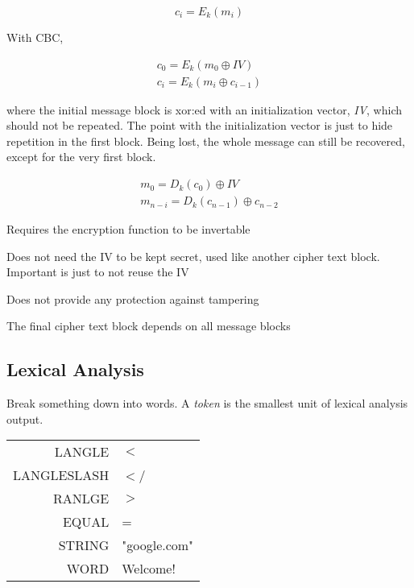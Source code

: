 \documentclass[12pt]{article}
\begin{document}
\begin{equation}
c_i = E_k(m_i)
\end{equation}

With CBC, 

\begin{equation}
\begin{split}
c_0 = E_k(m_0 \oplus IV) \\
c_i = E_k(m_i \oplus c_{i-1})
\end{split}
\end{equation}

where the initial message block is xor:ed with an initialization vector, \emph{IV}, which should not be repeated. The point with the initialization vector is just to hide repetition in the first block. Being lost, the whole message can still be recovered, except for the very first block.

\begin{equation}
\begin{split}
m_0 = D_k(c_0) \oplus IV \\
m_{n-i} = D_k(c_{n-1}) \oplus c_{n-2}
\end{split}
\end{equation}

\begin{list}{*}{
\setlength{\itemsep}{0pt}
\setlength{\parsep}{0pt}
\setlength{\topsep}{0pt}
\setlength{\partopsep}{0pt}
\setlength{\leftmargin}{2em}
\setlength{\labelwidth}{1.5em}
\setlength{\labelsep}{0.5em}
}
\item Requires the encryption function to be invertable
\item Does not need the IV to be kept secret, used like another cipher text block. Important is just to not reuse the IV
\item Does not provide any protection against tampering
\item The final cipher text block depends on all message blocks
\end{list}

\subsection{Lexical Analysis}

Break something down into words. A \emph{token} is the smallest unit of lexical analysis output.

\begin{tabular}{r | l}
	LANGLE & $<$ \\
	LANGLESLASH & $<$\slash \\
	RANLGE & $>$ \\
	EQUAL & = \\
	STRING & "google.com" \\
	WORD & Welcome!
\end{tabular}
\end{document}
